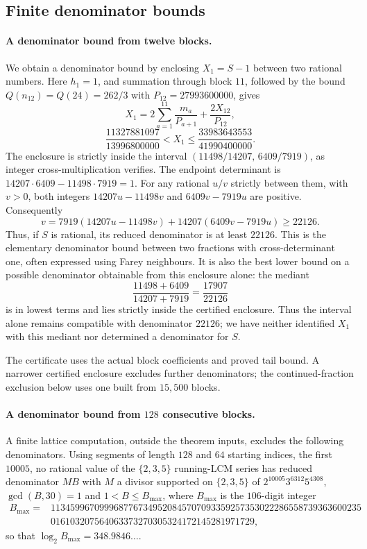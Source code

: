 \documentclass[11pt]{article}
\theoremstyle{remark}
\theoremstyle{plain}
\begin{document}
\subsection{Finite denominator bounds}

\paragraph{A denominator bound from twelve blocks.}
We obtain a denominator bound by enclosing $X_1=S-1$ between two rational
numbers. Here $h_1=1$, and summation through block $11$, followed by the
bound $Q(n_{12})=Q(24)=262/3$ with $P_{12}=27993600000$, gives
\[
 X_1=2\sum_{a=1}^{11}\frac{m_a}{P_{a+1}}
          +\frac{2X_{12}}{P_{12}},
\]
\[
 \frac{11327881097}{13996800000}<X_1
 \le\frac{33983643553}{41990400000}.
\]
The enclosure is strictly inside the interval
$(11498/14207,\,6409/7919)$, as integer cross-multiplication verifies.
The endpoint determinant is $14207\cdot6409-11498\cdot7919=1$.
For any rational $u/v$ strictly between them, with $v>0$, both integers
$14207u-11498v$ and $6409v-7919u$ are positive.  Consequently
\[
 v=7919(14207u-11498v)+14207(6409v-7919u)\ge22126.
\]
Thus, if $S$ is rational, its reduced denominator is at least $22126$.
This is the elementary denominator bound between two fractions with
cross-determinant one, often expressed using Farey neighbours.  It is
also the best lower bound on a possible denominator obtainable from
this enclosure alone: the mediant
\[
 \frac{11498+6409}{14207+7919}=\frac{17907}{22126}
\]
is in lowest terms and lies strictly inside the certified enclosure.
Thus the interval alone remains compatible with denominator $22126$;
we have neither identified $X_1$ with this mediant nor determined a
denominator for $S$.

The certificate uses the actual block coefficients and proved tail
bound.  A narrower certified enclosure excludes further denominators;
the continued-fraction exclusion below uses one built from $15{,}500$
blocks.

\paragraph{A denominator bound from $128$ consecutive blocks.}
\label{long269:res:lead-block-exclusion}
A finite lattice computation, outside the theorem inputs, excludes the
following denominators.  Using segments of length $128$ and $64$ starting
indices, the first $10005$, no rational value
of the $\{2,3,5\}$ running-LCM series has reduced denominator $MB$ with $M$ a
divisor supported on $\{2,3,5\}$ of $2^{10005}3^{6312}5^{4308}$, $\gcd(B,30)=1$ and
$1<B\le B_{\max}$, where $B_{\max}$ is the $106$-digit integer
\[
\begin{aligned}
 B_{\max}={}&1134599670999687767349520845707093359257353022286558739363600235\\
 &016103207564063373270305324172145281971729 ,
\end{aligned}
\]
so that $\log_2B_{\max}=348.9846\ldots$.
\end{document}

